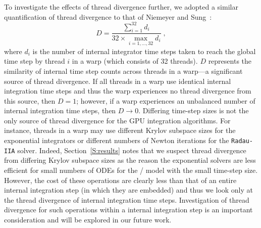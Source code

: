 \documentclass[preprint]{elsarticle}
\begin{document}
To investigate the effects of thread divergence further, we adopted a similar quantification of thread divergence to that of Niemeyer and Sung~\cite{Niemeyer:2014aa}:
\begin{equation}
	D = \frac{\sum_{i=1}^{32}{d_i}}{32 \times \max\limits_{i = 1, \dots, 32} d_i} \;,
	\label{eqn:divergence}
\end{equation}
where $d_i$ is the number of internal integrator time steps taken to reach the global time step by thread $i$ in a warp (which consists of 32 threads).
$D$ represents the similarity of internal time step counts across threads in a warp---a significant source of thread divergence.
If all threads in a warp use identical internal integration time steps and thus the warp experiences no thread divergence from this source, then $D = 1$; however, if a warp experiences an unbalanced number of internal integration time steps, then $D \to 0$.
Differing time-step sizes is not the only source of thread divergence for the GPU integration algorithms.
For instance, threads in a warp may use different Krylov subspace sizes for the exponential integrators or different numbers of Newton iterations for the \texttt{Radau-IIA} solver.
Indeed, Section~\ref{S:results} notes that we suspect thread divergence from differing Krylov subspace sizes as the reason the exponential solvers are less efficient for small numbers of ODEs for the \slash{} model with the small time-step size.
However, the cost of these operations are clearly less than that of an entire internal integration step (in which they are embedded) and thus we look only at the thread divergence of internal integration time steps.
Investigation of thread divergence for such operations within a internal integration step is an important consideration and will be explored in our future work.
\end{document}
